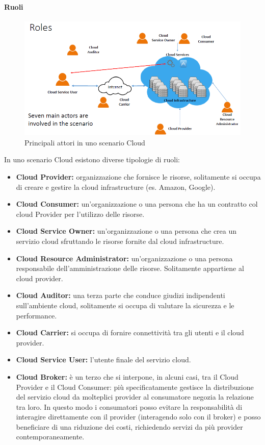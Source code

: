 \documentclass{article}
\begin{document}
\paragraph{Ruoli}
\begin{figure}[H]
    \centering
    \includegraphics[scale=0.7]{img/roles.png}
    \caption{Principali attori in uno scenario Cloud}
\end{figure}
In uno scenario Cloud esistono diverse tipologie di ruoli:
\begin{itemize}
    \item\textbf{Cloud Provider:} organizzazione che fornisce le risorse, solitamente si occupa di creare e gestire la cloud infrastructure (es. Amazon, Google).
    \item \textbf{Cloud Consumer:} un’organizzazione o una persona che ha un contratto col cloud Provider per l’utilizzo delle risorse.
    \item \textbf{Cloud Service Owner:} un’organizzazione o una persona che crea un servizio cloud sfruttando le risorse fornite dal cloud infrastructure.
    \item \textbf{Cloud Resource Administrator: }un’organizzazione o una persona responsabile dell’amministrazione delle risorse. Solitamente appartiene al cloud provider.
    \item \textbf{Cloud Auditor:} una terza parte che conduce giudizi indipendenti sull’ambiente cloud, solitamente si occupa di valutare la sicurezza e le performance.
    \item \textbf{Cloud Carrier:} si occupa di fornire connettività tra gli utenti e il cloud provider.
    \item \textbf{Cloud Service User:} l’utente finale del servizio cloud.
    \item \textbf{Cloud Broker:} è un terzo che si interpone, in alcuni casi, tra il Cloud Provider e il Cloud Consumer: più specificatamente gestisce la distribuzione del servizio cloud da molteplici provider al consumatore negozia la relazione tra loro. In questo modo i consumatori posso evitare la responsabilità di interagire direttamente con il provider (interagendo solo con il broker) e posso beneficiare di una riduzione dei costi, richiedendo servizi da più provider contemporaneamente.
\end{itemize}
\end{document}
